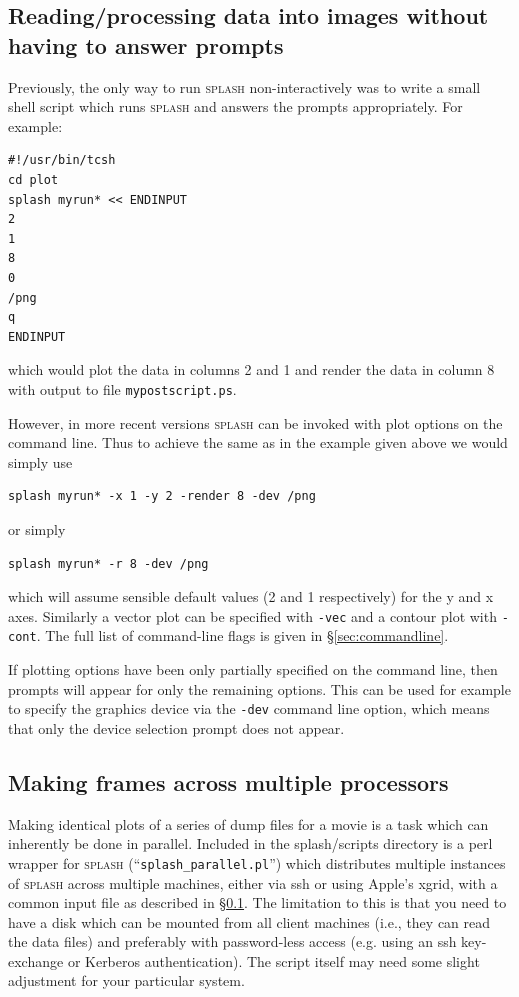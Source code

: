 \documentclass[a4paper,10pt]{article}
\newcommand{\splash}{\textsc{splash }}
\begin{document}
\subsection{Reading/processing data into images without having to answer prompts}
\label{sec:batchmode}
 Previously, the only way to run \splash
non-interactively was to write a small shell script which runs \splash
and answers the prompts appropriately. For example:
\begin{verbatim}
#!/usr/bin/tcsh
cd plot
splash myrun* << ENDINPUT
2
1
8
0
/png
q
ENDINPUT
\end{verbatim}
which would plot the data in columns 2 and 1 and render the data in column 8 with
output to file \verb+mypostscript.ps+.

 However, in more recent versions \splash can be invoked with plot options on the command line.  Thus to achieve the same as in the example given above we would simply use
\begin{verbatim}
splash myrun* -x 1 -y 2 -render 8 -dev /png
\end{verbatim}
or simply
\begin{verbatim}
splash myrun* -r 8 -dev /png
\end{verbatim}
which will assume sensible default values (2 and 1 respectively) for the y and x axes. Similarly a vector plot can be specified with \verb+-vec+ and a contour plot with \verb+-cont+. The full list of command-line flags is given in \S\ref{sec:commandline}.

 If plotting options have been only partially specified on the command line, then prompts will appear for only the remaining options. This can be used for example to specify the graphics device via the \verb+-dev+ command line option, which means that only the device selection prompt does not appear.


\subsection{Making frames across multiple processors}
 Making identical plots of a series of dump files for a movie is a task which can inherently be done in parallel. Included in the splash/scripts directory is a perl wrapper for \splash (``\verb+splash_parallel.pl+'') which distributes multiple instances of \splash across multiple machines, either via ssh or using Apple's xgrid, with a common input file as described in \S\ref{sec:batchmode}. The limitation to this is that you need to have a disk which can be mounted from all client machines (i.e., they can read the data files) and preferably with password-less access (e.g. using an ssh key-exchange or Kerberos authentication). The script itself may need some slight adjustment for your particular system.
 
\end{document}
